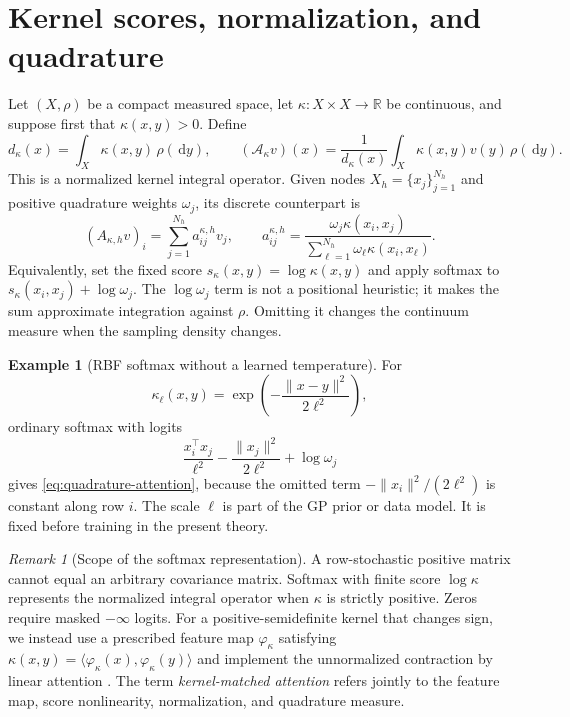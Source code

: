 \documentclass[11pt,a4paper]{article}
\numberwithin{equation}{section}
\theoremstyle{definition}
\newtheorem{example}[theorem]{Example}
\theoremstyle{remark}
\newtheorem{remark}[theorem]{Remark}
\newcommand{\R}{\mathbb R}
\newcommand{\calA}{\mathcal A}
\newcommand{\dd}{\,\mathrm d}
\begin{document}
\section{Kernel scores, normalization, and quadrature}
\label{sec:kernel-attention}

Let $(X,\rho)$ be a compact measured space, let $\kappa:X\times X\to\R$ be
continuous, and suppose first that $\kappa(x,y)>0$.  Define
\begin{equation}
 d_\kappa(x)=\int_X\kappa(x,y)\,\rho(\dd y),\qquad
 (\calA_\kappa v)(x)
 =\frac{1}{d_\kappa(x)}
 \int_X\kappa(x,y)v(y)\,\rho(\dd y).
 \label{eq:continuum-attention}
\end{equation}
This is a normalized kernel integral operator.  Given nodes
$X_h=\{x_j\}_{j=1}^{N_h}$ and positive quadrature weights $\omega_j$, its
discrete counterpart is
\begin{equation}
 (A_{\kappa,h}v)_i
 =\sum_{j=1}^{N_h}a_{ij}^{\kappa,h}v_j,
 \qquad
 a_{ij}^{\kappa,h}
 =\frac{\omega_j\kappa(x_i,x_j)}
 {\sum_{\ell=1}^{N_h}\omega_\ell\kappa(x_i,x_\ell)}.
 \label{eq:quadrature-attention}
\end{equation}
Equivalently, set the fixed score $s_\kappa(x,y)=\log\kappa(x,y)$ and apply
softmax to $s_\kappa(x_i,x_j)+\log\omega_j$.  The $\log\omega_j$ term is not
a positional heuristic; it makes the sum approximate integration against
$\rho$.  Omitting it changes the continuum measure when the sampling density
changes.

\begin{example}[RBF softmax without a learned temperature]
For
\[
 \kappa_\ell(x,y)=\exp\!\left(-\frac{\|x-y\|^2}{2\ell^2}\right),
\]
ordinary softmax with logits
\[
 \frac{x_i^\top x_j}{\ell^2}
 -\frac{\|x_j\|^2}{2\ell^2}+\log\omega_j
\]
gives \eqref{eq:quadrature-attention}, because the omitted term
$-\|x_i\|^2/(2\ell^2)$ is constant along row $i$.  The scale $\ell$ is part
of the GP prior or data model.  It is fixed before training in the present
theory.
\end{example}

\begin{remark}[Scope of the softmax representation]
A row-stochastic positive matrix cannot equal an arbitrary covariance matrix.
Softmax with finite score \(\log\kappa\) represents the normalized integral
operator when \(\kappa\) is strictly positive. Zeros require masked
\(-\infty\) logits. For a positive-semidefinite kernel that changes sign, we
instead use a prescribed feature map $\varphi_\kappa$ satisfying
$\kappa(x,y)=\langle\varphi_\kappa(x),\varphi_\kappa(y)\rangle$ and implement
the unnormalized contraction by linear attention
\citep{katharopoulos2020transformers}.  The term
\emph{kernel-matched attention} refers jointly to the feature map, score
nonlinearity, normalization, and quadrature measure.
\end{remark}
\end{document}
